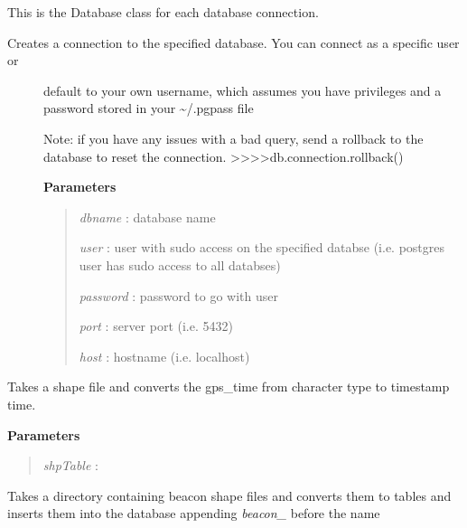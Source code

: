 \documentclass[letterpaper,10pt,openany,oneside]{sphinxmanual}
\begin{document}
\begin{fulllineitems}
\label{code:Database.Database}
This is the Database class for each database connection.
\begin{description}
\item[{Creates a connection to the specified database.  You can connect as a specific user or }] \leavevmode
default to your own username, which assumes you have privileges and a password stored in your  \textasciitilde{}/.pgpass file

Note: if you have any issues with a bad query, send a rollback to the database to reset the connection.
\textgreater{}\textgreater{}\textgreater{}\textgreater{}db.connection.rollback()

\textbf{Parameters}
\begin{quote}

\emph{dbname}   : database name

\emph{user}     : user with sudo access on the specified databse (i.e. postgres user has sudo access to all databses)

\emph{password} : password to go with user

\emph{port}     : server port (i.e. 5432)

\emph{host}     : hostname (i.e. localhost)
\end{quote}

\end{description}

\begin{fulllineitems}
\label{code:Database.Database.alterTimestamp}
Takes a shape file and converts the gps\_time from character type to timestamp time.

\textbf{Parameters}
\begin{quote}

\emph{shpTable} :
\end{quote}

\end{fulllineitems}


\begin{fulllineitems}
\label{code:Database.Database.beaconShapefilesToTables}
Takes a directory containing beacon shape files and converts them to tables and 
inserts them into the database appending \emph{beacon\_} before the name


\end{fulllineitems}
\end{fulllineitems}
\end{document}
